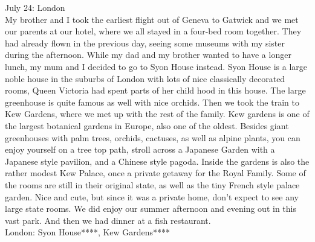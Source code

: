 July 24: London\\
My brother and I took the earliest flight out of Geneva to Gatwick and we met our parents at our hotel, where we all stayed in a four-bed room together. They had already flown in the previous day, seeing some museums with my sister during the afternoon. While my dad and my brother wanted to have a longer lunch, my mum and I decided to go to Syon House instead. Syon House is a large noble house in the suburbs of London with lots of nice classically decorated rooms, Queen Victoria had spent parts of her child hood in this house. The large greenhouse is quite famous as well with nice orchids. Then we took the train to Kew Gardens, where we met up with the rest of the family. Kew gardens is one of the largest botanical gardens in Europe, also one of the oldest. Besides giant greenhouses with palm trees, orchids, cactuses, as well as alpine plants, you can enjoy yourself on a tree top path, stroll across a Japanese Garden with a Japanese style pavilion, and a Chinese style pagoda. Inside the gardens is also the rather modest Kew Palace, once a private getaway for the Royal Family. Some of the rooms are still in their original state, as well as the tiny French style palace garden. Nice and cute, but since it was a private home, don't expect to see any large state rooms. We did enjoy our summer afternoon and evening out in this vast park. And then we had dinner at a fish restaurant.\\

London: Syon House****, Kew Gardens****\\

